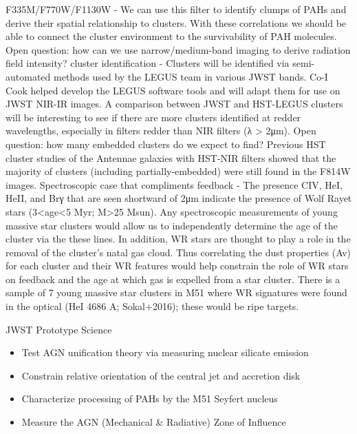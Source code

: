\documentclass[12pt]{article}
\begin{document}
F335M/F770W/F1130W - We can use this filter to identify clumps of PAHs and derive their spatial relationship to clusters. With these correlations we should be able to connect the cluster environment to the survivability of PAH molecules. Open question: how can we use narrow/medium-band imaging to derive radiation field intensity?
cluster identification - Clusters will be identified via semi-automated methods used by the LEGUS team in various JWST bands. Co-I Cook helped develop the LEGUS software tools and will adapt them for use on JWST NIR-IR images. A comparison between JWST and HST-LEGUS clusters will be interesting to see if there are more clusters identified at redder wavelengths, especially in filters redder than NIR filters (λ > 2μm). Open question: how many embedded clusters do we expect to find? Previous HST cluster studies of the Antennae galaxies with HST-NIR filters showed that the majority of clusters (including partially-embedded) were still found in the F814W images.
Spectroscopic case that compliments feedback - The presence  CIV,  HeI,  HeII,  and  Brγ that are seen shortward of 2μm indicate the presence of Wolf Rayet stars (3<age<5 Myr; M>25 Msun). Any spectroscopic measurements of young massive star clusters would allow us to independently determine the age of the cluster via the these lines. In addition, WR stars are thought to play a role in the removal of the cluster's natal gas cloud. Thus correlating the dust properties (Av) for each cluster and their WR features would help constrain the role of WR stars on feedback and the age at which gas is expelled from a star cluster. There is a sample of 7 young massive star clusters in M51 where WR signatures were found in the optical (HeI 4686 A; Sokal+2016); these would be ripe targets. 

\vspace{0.1in}


JWST Prototype Science
\begin{itemize}
    \item{Test AGN unification theory via measuring nuclear silicate emission}
    \item{Constrain relative orientation of the central jet and accretion disk}
    \item{Characterize processing of PAHs by the M51 Seyfert nucleus}
    \item{Measure the AGN (Mechanical & Radiative) Zone of Influence}
\end{itemize}
\end{document}
